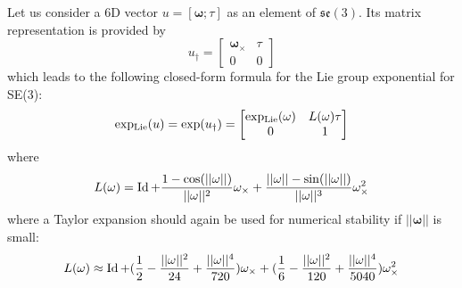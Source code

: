 Let us consider a 6D vector $u=[\mathbf{\omega};\tau]$ as an element of $\mathfrak{se}(3)$. Its matrix representation is provided by
\begin{equation}
u_\dagger =
\begin{bmatrix}
\mathbf{\omega}_\times & \tau \\
0  & 0
\end{bmatrix}
\end{equation}
which leads to the following closed-form formula for the Lie group exponential for SE(3):
\begin{equation}
\operatorname{exp_{Lie}}(u) = \exp(u_\dagger) =
\begin{bmatrix}
\operatorname{exp_{Lie}}(\mathbf{\omega}) & L(\mathbf{\omega})\tau \\
0  & 1
\end{bmatrix}
\end{equation}
where
\begin{equation}
L(\mathbf{\omega}) = \operatorname{Id}
+ \frac{1-\cos(||\mathbf{\omega}||)}{||\mathbf{\omega}||^2}\mathbf{\omega}_\times
+ \frac{||\mathbf{\omega}||-\sin(||\mathbf{\omega}||)}{||\mathbf{\omega}||^3}\mathbf{\omega}_\times^2
\end{equation}
where a Taylor expansion should again be used for numerical stability if $||\mathbf{\omega}||$ is small:
\begin{equation}
L(\mathbf{\omega}) \approx \operatorname{Id}
+ (\frac{1}{2}-\frac{||\mathbf{\omega}||^2}{24}+\frac{||\mathbf{\omega}||^4}{720})\mathbf{\omega}_\times
+ (\frac{1}{6}-\frac{||\mathbf{\omega}||^2}{120}+\frac{||\mathbf{\omega}||^4}{5040})\mathbf{\omega}_\times^2
\end{equation}

